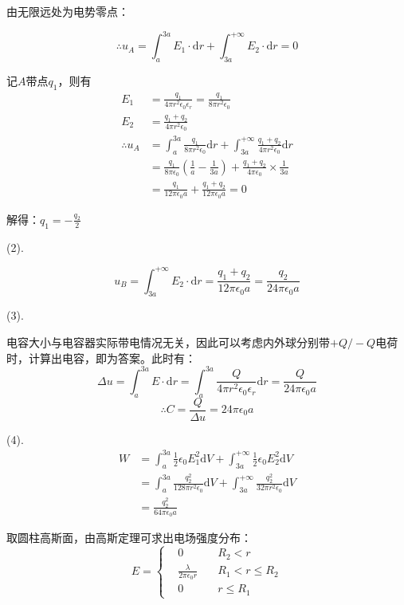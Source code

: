 \documentclass[b5paper,opensource,sourcefont,parskip]{qyxf-book}
\newcommand{\di}[1]{\mathrm{d}#1}
\begin{document}
由无限远处为电势零点：

\begin{equation}
\therefore u_A=\int_a^{3a} E_1\cdot\di{r} +\int_{3a}^{+\infty} E_2\cdot\di{r} =0
\end{equation}

记$ A $带点$ q_1 $，则有
\begin{equation}
\begin{aligned}
E_1&=\frac{q_1}{4\pi r^2\epsilon_0\epsilon_r}=\frac{q_1}{8\pi r^2\epsilon_0}\\
E_2&=\frac{q_1+q_2}{4\pi r^2\epsilon_0}\\
\therefore u_A&=\int_a^{3a}\frac{q_1}{8\pi r^2\epsilon_0}\di{r}+\int_{3a}^{+\infty}\frac{q_1+q_2}{4\pi r^2\epsilon_0}\di{r}\\
&=\frac{q_1}{8\pi\epsilon_0}\left(\frac{1}{a}-\frac{1}{3a}\right)+\frac{q_1+q_2}{4\pi\epsilon_0}\times \frac{1}{3a}\\
&=\frac{q_1}{12\pi\epsilon_0a}+\frac{q_1+q_2}{12\pi\epsilon_0a}=0
\end{aligned}
\end{equation}

解得：$ q_1=-\frac{q_2}{2} $

(2).

\[u_B=\int_{3a}^{+\infty}E_2\cdot \di{r}=\frac{q_1+q_2}{12\pi\epsilon_0a}=\frac{q_2}{24\pi\epsilon_0a}\]

(3).

电容大小与电容器实际带电情况无关，因此可以考虑内外球分别带$ +Q/-Q $电荷时，计算出电容，即为答案。此时有：
\[\Delta u=\int_a^{3a}E\cdot \di{r}=\int_a^{3a}\frac{Q}{4\pi r^2\epsilon_0\epsilon_r}\di{r}=\frac{Q}{24\pi\epsilon_0a}\]
\[\therefore C=\frac{Q}{\Delta u}=24\pi\epsilon_0a\]

(4).
\begin{align*}
W&=\int_a^{3a}\frac{1}{2}\epsilon_0 E_1^2\di{V}+\int_{3a}^{+\infty}\frac{1}{2}\epsilon_0 E_2^2\di{V}\\
&=\int_a^{3a}\frac{q_2^2}{128\pi r^2\epsilon_0} \di{V}+\int_{3a}^{+\infty}\frac{q_2^2}{32\pi r^2\epsilon_0}\di{V}\\
&=\frac{q_2^2}{64\pi\epsilon_0a}
\end{align*}


\solve 取圆柱高斯面，由高斯定理可求出电场强度分布：
\begin{equation}
E=\left\{
\begin{aligned}
&0\quad &R_2<r\\
&\frac{\lambda}{2\pi\epsilon_0 r}\quad &R_1<r\leqslant R_2\\
&0	&r\leqslant R_1
\end{aligned}
\right.
\end{equation}
\end{document}
